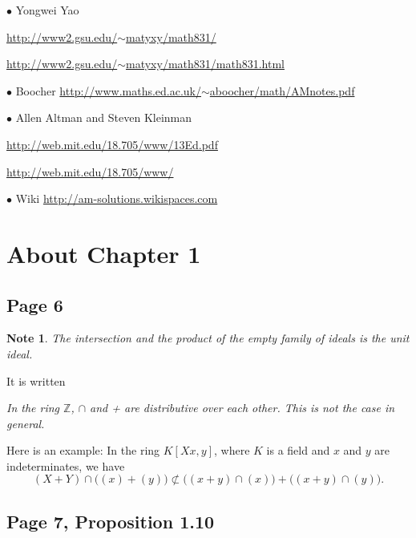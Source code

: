 \documentclass[parskip=half,fontsize=12pt]{scrartcl}%
\newcommand{\bu}{\bullet}
\newtheorem{note}[thm]{Note}
\begin{document}
$\bu$ Yongwei Yao

\href{http://www2.gsu.edu/~matyxy/math831/}{http://www2.gsu.edu/$\sim$matyxy/math831/}

\href{http://www2.gsu.edu/~matyxy/math831/math831.html}{http://www2.gsu.edu/$\sim$matyxy/math831/math831.html}


$\bu$ Boocher \href{http://www.maths.ed.ac.uk/~aboocher/math/AMnotes.pdf}{\small http://www.maths.ed.ac.uk/$\sim$aboocher/math/AMnotes.pdf}

$\bu$ Allen Altman and Steven Kleinman %

\href{http://web.mit.edu/18.705/www/13Ed.pdf}{http://web.mit.edu/18.705/www/13Ed.pdf}

\href{http://web.mit.edu/18.705/www/}{http://web.mit.edu/18.705/www/}

$\bu$ Wiki \href{http://am-solutions.wikispaces.com}{http://am-solutions.wikispaces.com}

\section{About Chapter 1}

\subsection{Page 6}%

\begin{note}\label{ef}
The intersection and the product of the empty family of ideals is the unit ideal.
\end{note}

It is written

\emph{In the ring $\mathbb Z$, $\cap$ and + are distributive over each other. This is not the case in general.}

Here is an example: In the ring $K[Xx,y]$, where $K$ is a field and $x$ and $y$ are indeterminates, we have 
$$
(X+Y)\cap\Big((x)+(y)\Big)\not\subset\Big((x+y)\cap (x)\Big)+\Big((x+y)\cap (y)\Big).
$$

\subsection{Page 7, Proposition 1.10}%
\end{document}
